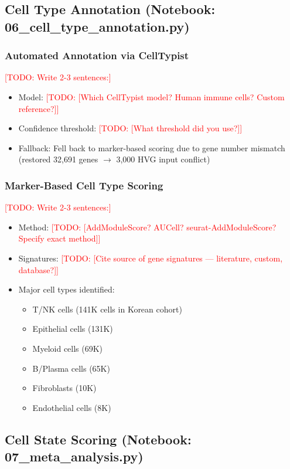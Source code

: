 \documentclass[12pt,oneside]{article}
\newcommand{\TODO}[1]{\textcolor{red}{[TODO: #1]}}
\begin{document}
\subsection{Cell Type Annotation (Notebook: 06\_cell\_type\_annotation.py)}

\subsubsection{Automated Annotation via CellTypist}
\TODO{Write 2-3 sentences:}
\begin{itemize}
    \item Model: \TODO{[Which CellTypist model? Human immune cells? Custom reference?]}
    \item Confidence threshold: \TODO{[What threshold did you use?]}
    \item Fallback: Fell back to marker-based scoring due to gene number mismatch (restored 32,691 genes $\to$ 3,000 HVG input conflict)
\end{itemize}

\subsubsection{Marker-Based Cell Type Scoring}
\TODO{Write 2-3 sentences:}
\begin{itemize}
    \item Method: \TODO{[AddModuleScore? AUCell? seurat-AddModuleScore? Specify exact method]}
    \item Signatures: \TODO{[Cite source of gene signatures — literature, custom, database?]}
    \item Major cell types identified:
    \begin{itemize}
        \item T/NK cells (141K cells in Korean cohort)
        \item Epithelial cells (131K)
        \item Myeloid cells (69K)
        \item B/Plasma cells (65K)
        \item Fibroblasts (10K)
        \item Endothelial cells (8K)
    \end{itemize}
\end{itemize}

\subsection{Cell State Scoring (Notebook: 07\_meta\_analysis.py)}
\end{document}
